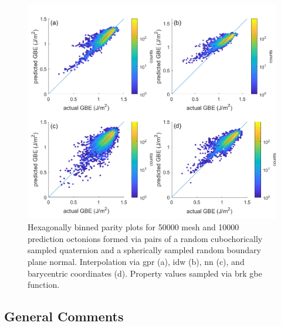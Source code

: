 \documentclass[preprint,12pt]{elsarticle}
\begin{document}
\begin{figure}
    \centering
    \includegraphics{brkparity50000.png}
    \caption{Hexagonally binned parity plots for 50000 mesh and 10000 prediction octonions formed via pairs of a random cubochorically sampled quaternion and a spherically sampled random boundary plane normal. Interpolation via \acrlong{gpr} (a), \acrlong{idw} (b), \acrlong{nn} (c), and barycentric coordinates (d). Property values sampled via \acrlong{brk} \acrlong{gbe} function.}
    \label{fig:brkparity50000}
\end{figure}

\subsection{General Comments}
\end{document}
